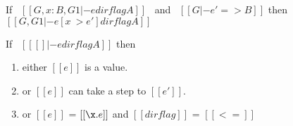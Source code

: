 \begin{comment}
\begin{proof}
  By induction on typing relation and subsequent inverting reduction relation.
  \begin{itemize}
    \item Cases \rref{typ-int, typ-var, typ-sub, typ-abs} are trivial to prove.
    \item Case \rref{typ-ann} requires helping \cref{lemma:union:check-pexpr-ann}.
    \item Case \rref{typ-app} requires helping \cref{lemma:union:pexpr-check-sub}
          and substitution \cref{lemma:union:substitution} for beta reduction.
    \item Case \rref{typ-typeof} requires substitution \cref{lemma:union:substitution}.
  \end{itemize}
\end{proof}

\baber{ToDo: change name of helping lemmas.}

\begin{lemma}[check-pexpr-ann]
\label{lemma:union:check-pexpr-ann}
  If \ $[[G |- p:C <= A]]$ \ then \ $[[G |- p <= A]]$.
\end{lemma}

\begin{lemma}[pexpr-check-sub]
\label{lemma:union:pexpr-check-sub}
  If \ $[[G |- p <= A]]$ \ and \ $[[A <: B]]$ \ then \ $[[G |- p <= B]]$.
\end{lemma}
\end{comment}

\begin{lemma}[Substitution]
\label{lemma:union:substitution}
  If \ $[[G, x:B , G1 |- e dirflag A]]$ \ and \ $[[G |- e' => B]]$
  then \ $[[G, G1 |- e [ x ~> e' ] dirflag A]]$
\end{lemma}

\begin{lemma}[Progress]
\label{lemma:union:progress}
If \ $[[ [] |- e dirflag A]]$ then
 \begin{enumerate}
  \item either $[[e]]$ is a value.
  \item or $[[e]]$ can take a step to $[[e']]$.
  \item or $[[e]]$ = $[[\x.e]]$ and $[[dirflag]]$ = $[[<=]]$
  \end{enumerate}
\end{lemma}

